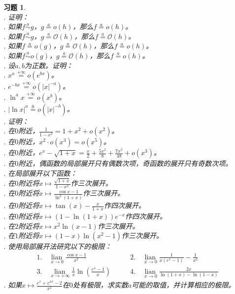 \documentclass[12pt,UTF8]{ctexbook}
\newcommand{\lian}[1]{
    \underset{#1}{\operatorname{lian}\,}
}
\newcommand{\oveq}[1]{\overset{#1}{=}}
\newcommand{\olim}[1]{\mathit{o}\left(#1\right)}  %
\newcommand{\Olim}[1]{\mathcal{O}\left(#1\right)}  %
\newcommand{\eqlim}[1]{\overset{#1}{\sim}}  %
\theoremstyle{definition}
\theoremstyle{plain}
\newtheorem{xt}{习题}[section]
\begin{document}
\begin{xt}
    \mbox{} \\
    . 证明：\\
    . 如果$f \eqlim{a} g$，$g \oveq{a} \olim{h}$，那么$f \oveq{a} \olim{h}$。\\
    . 如果$f \eqlim{a} g$，$g \oveq{a} \Olim{h}$，那么$f \oveq{a} \Olim{h}$。\\
    . 如果$f \oveq{a} \olim{g}$，$g \oveq{a} \Olim{h}$，那么$f \oveq{a} \olim{h}$。\\
    . 如果$f \eqlim{a} \olim{g}$，$g \oveq{a} \Olim{h}$，那么$f \oveq{a} \olim{h}$。\\
    . 设$a, b$为正数。证明：\\
    . $x^a \oveq{+\infty} \olim{e^{bx}}$。\\
    . $e^{-bx} \oveq{+\infty} \olim{|x|^{-a}}$。\\
    . $\ln^{a}{x} \oveq{+\infty} \olim{x^{b}}$。\\
    . $|\ln{x}|^{a} \oveq{0} \olim{|x|^{-b}}$。\\
    . 证明：\\
    . 在$0$附近，$\frac{1}{1 - x^2} = 1 + x^2 + \olim{x^2}$。\\
    . 在$0$附近，$x^2 \cdot \olim{x^3} = \olim{x^5}$。\\
    . 在$0$附近，$e^x - \sqrt{1 + x} = \frac{x}{2} + \frac{5x^2}{8} + \frac{7x^3}{48} + \olim{x^3}$。\\
    . 在$0$附近，偶函数的局部展开只有偶数次项，奇函数的展开只有奇数次项。\\
    . 在局部展开以下函数：\\
    . 在$0$附近将$x\mapsto \frac{\sqrt{1 + x}}{1 - x^2}$作三次展开。\\
    . 在$0$附近将$x\mapsto \frac{\cos{x} - 1}{\ln^2{(1 + x)}}$作三次展开。\\
    . 在$0$附近将$x\mapsto \tan{(x)} - \frac{x}{1 + x}$作四次展开。\\
    . 在$0$附近将$x\mapsto (1 - \ln{(1 + x)})e^{-x}$作四次展开。\\
    . 在$2$附近将$x\mapsto x^2\ln{(x - 1)}$作三次展开。\\
    . 在$1$附近将$x\mapsto (1 - x)\ln{(x^2 - 1)}$作三次展开。\\
    . 使用局部展开法研究以下的极限：\\
    $$
    \begin{array}{ll}
        1. \quad \lian{x\to 0} \frac{\cos{x} - 1}{x^2} & \qquad 2. \quad \lian{x\to 0} \frac{1}{x \left(e^x - 1\right)} - \frac{1}{x^2} \\
        3. \quad \lian{x\to +\infty} \frac{1}{x}\ln{\left(\frac{e^x - 1}{x}\right)} & \qquad 4. \quad \lian{x\to 0} \frac{2x}{\ln{(1+x)} - \ln{(1-x)}} 
    \end{array}
    $$
    . 如果$x \mapsto \frac{e^{x} + e^{ax} - 2}{x^2}$在$0$处有极限，求实数$a$可能的取值，并计算相应的极限。
\end{xt}
\end{document}
